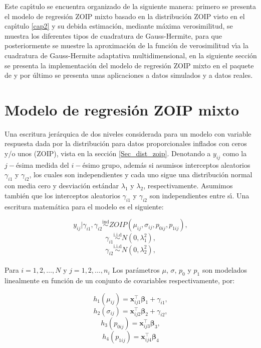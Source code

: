 Este cap\'{\i}tulo se encuentra organizado de la siguiente manera: primero se presenta el modelo de regresi\'{o}n ZOIP mixto basado en la distribuci\'{o}n ZOIP visto en el cap\'{\i}tulo \ref{cap2} y su debida estimaci\'{o}n, mediante m\'{a}xima verosimilitud, se muestra los diferentes tipos de cuadratura de Gauss-Hermite, para que posteriormente se muestre la aproximaci\'{o}n de la funci\'{o}n de verosimilitud v\'{\i}a la cuadratura de Gauss-Hermite adaptativa multidimensional, en la si\-gui\-en\-te secci\'{o}n se presenta la implementaci\'{o}n del modelo de regresi\'{o}n ZOIP mixto en el paquete  de  y por \'{u}ltimo se presenta unas aplicaciones a datos simulados y a datos reales.



\section{Modelo de regresi\'{o}n ZOIP mixto}


Una escritura jer\'{a}rquica de dos niveles considerada para un modelo con variable respuesta dada por la distribuci\'{o}n para datos proporcionales inflados con ceros y/o unos (ZOIP), vista en la secci\'{o}n \ref{Sec_dist_zoip}. Denotando a $y_{ij}$ como la $j-$\'{e}sima medida del $i-$\'{e}simo grupo, adem\'{a}s si asumisos interceptos aleatorios $\gamma_{i1}$ y $\gamma_{i2}$, los cuales son independientes y cada uno sigue una distribuci\'{o}n normal con media cero y desviaci\'{o}n est\'{a}ndar $\lambda_1$ y $\lambda_2$, respectivamente. Asumimos tambi\'{e}n que los interceptos aleatorios $\gamma_{i1}$ y $\gamma_{i2}$ son independientes entre s\'{\i}. Una escritura matem\'{a}tica para el modelo es el siguiente:

\[
y_{ij}| \gamma_{i1},\gamma_{i2} \overset{\text{ind}}{\sim} ZOIP(\mu_{ij},\sigma_{ij},p_{0ij}, p_{1ij}),
\]
\[
\gamma_{i1} \overset{\text{i.i.d}}{\sim}  N(0,\lambda_1^2),
\]
\[
\gamma_{i2} \overset{\text{i.i.d}}{\sim}  N(0,\lambda_2^2),
\]
\\
Para $i=1,2,\ldots, N$ y $j=1,2,\ldots, n_i$ Los par\'{a}metros $\mu$, $\sigma$, $p_0$ y $p_1$ son modelados linealmente en funci\'{o}n de un conjunto de covariables respectivamente, por:


\[
h_1(\mu_{ij})=\mathbf{x}_{ij1}^{\top} \boldsymbol{\beta}_1+ \gamma_{i1},
\]
\[
h_2(\sigma_{ij})=\mathbf{x}_{ij2}^{\top} \boldsymbol{\beta}_2+ \gamma_{i2},
\]
\[
h_3(p_{0ij})=\mathbf{x}_{ij3}^{\top} \boldsymbol{\beta}_3,
\]
\[
h_4(p_{1ij})=\mathbf{x}_{ij4}^{\top} \boldsymbol{\beta}_4
\]


